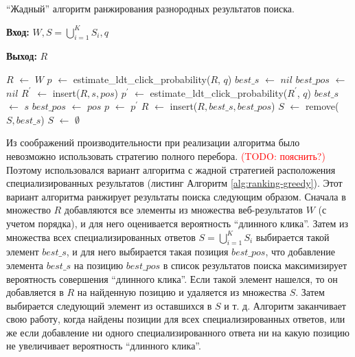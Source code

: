 \documentclass[12pt,a4paper]{report}
\makeatletter
\newcommand\note[1]{\textcolor{red}{(#1)}}
\newcommand\todonote[1]{\note{TODO: #1}}
\newenvironment{myalgorithm}[1][htb]{%
    \renewcommand{\ALG@name}{Алгоритм}%
   \begin{algorithm}[#1]%
  }{\end{algorithm}}
\newcommand*\Let[2]{\State #1 $\gets$ #2}
\makeatother
\begin{document}
\begin{myalgorithm}[t!]
\caption{``Жадный'' алгоритм ранжирования разнородных результатов поиска.}
\label{alg:ranking-greedy}
\textbf{Вход:} $W, S=\bigcup\limits_{i=1}^{K} S_i, q$ \par
\textbf{Выход:} $R$
\begin{algorithmic}[1]
    \Let{$R$}{$W$}
    \Let{$p$}{estimate\_ldt\_click\_probability($R$, $q$)}
      \Let{$best\_s$}{$nil$}
      \Let{$best\_pos$}{$nil$}
          \Let{$R^{'}$}{insert($R, s, pos$)}        
          \Let{$p^{'}$}{estimate\_ldt\_click\_probability($R^{'}$, $q$)}
            \Let{$best\_s$}{$s$}
            \Let{$best\_pos$}{$pos$}            
            \Let{$p$}{$p^{'}$}
          \EndIf
        \EndFor
      \EndFor
        \Let{$R$}{insert($R, best\_s, best\_pos$)}
        \Let{$S$}{remove($S, best\_s$)}   
      \Else %
        \Let{$S$}{$\emptyset$}
      \EndIf
    \EndWhile
\EndFunction
\end{algorithmic}
\end{myalgorithm}

Из соображений производительности при реализации алгоритма было невозможно использовать стратегию полного перебора. 
\todonote{пояснить?}
Поэтому использовался вариант алгоритма с жадной стратегией расположения специализированных результатов (листинг Алгоритм \ref{alg:ranking-greedy}). Этот вариант алгоритма ранжирует результаты поиска следующим образом. Сначала в множество $R$ добавляются все элементы из множества веб-результатов $W$ (с учетом порядка), и для него оценивается вероятность ``длинного клика''. Затем из множества всех специализированных ответов $S=\bigcup\limits_{i=1}^{K} S_i$ выбирается такой элемент $best\_s$, и для него выбирается такая позиция $best\_pos$, что добавление элемента $best\_s$ на позицию $best\_pos$ в список результатов поиска максимизирует вероятность совершения ``длинного клика''. Если такой элемент нашелся, то он добавляется в $R$ на найденную позицию и удаляется из множества $S$. Затем выбирается следующий элемент из оставшихся в $S$ и т. д. Алгоритм заканчивает свою работу, когда найдены позиции для всех специализированных ответов, или же если добавление ни одного специализированного ответа ни на какую позицию не увеличивает вероятность ``длинного клика''.
\end{document}
